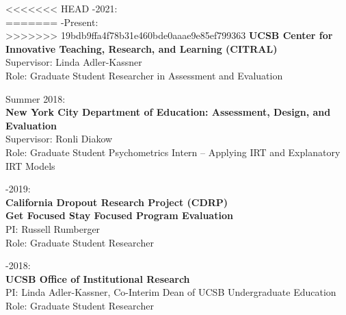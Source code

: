 \documentclass[12pt, oneside,]{memoir}
\begin{document}
<<<<<<< HEAD
-2021:\\
=======
-Present:\\
>>>>>>> 19bdb9ffa4f78b31e460bde0aaae9e85ef799363
\textbf{UCSB Center for Innovative Teaching, Research, and Learning
(CITRAL)}\\
\hspace*{0.333em}\hspace*{0.333em}Supervisor: Linda Adler-Kassner\\
\hspace*{0.333em}\hspace*{0.333em}Role: Graduate Student Researcher in
Assessment and Evaluation

\noindent Summer 2018:\\
\textbf{New York City Department of Education: Assessment, Design, and
Evaluation}\\
\hspace*{0.333em}\hspace*{0.333em}Supervisor: Ronli Diakow\\
\hspace*{0.333em}\hspace*{0.333em}Role: Graduate Student Psychometrics
Intern -- Applying IRT and Explanatory IRT Models

-2019:\\
\textbf{California Dropout Research Project (CDRP)}\\
\textbf{Get Focused Stay Focused Program Evaluation}\\
\hspace*{0.333em}\hspace*{0.333em}PI: Russell Rumberger\\
\hspace*{0.333em}\hspace*{0.333em}Role: Graduate Student Researcher

-2018:\\
\textbf{UCSB Office of Institutional Research}\\
\hspace*{0.333em}\hspace*{0.333em}PI: Linda Adler-Kassner, Co-Interim
Dean of UCSB Undergraduate Education\\
\hspace*{0.333em}\hspace*{0.333em}Role: Graduate Student Researcher
\vspace{4mm}
\end{document}
